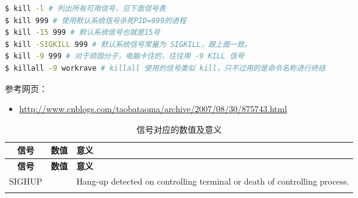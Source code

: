 \documentclass[doctor,openright,twoside]{sjtuthesis}
\providecommand{\tightlist}{%
    \setlength{\itemsep}{0pt}\setlength{\parskip}{0pt}}
\theoremstyle{plain}
\theoremstyle{definition}
\theoremstyle{remark}
\theoremstyle{ocrenumbox}
\theoremstyle{plain}
\begin{document}
\begin{lstlisting}[language=bash]
$ kill -l # 列出所有可用信号，见下面信号表
$ kill 999 # 使用默认系统信号杀死PID=999的进程
$ kill -15 999 # 默认系统信号也就是15号
$ kill -SIGKILL 999 # 默认系统信号常量为 SIGKILL，跟上面一致。
$ kill -9 999 # 对于顽固分子，电脑卡住的，往往用 -9 KILL 信号
$ killall -9 workrave # killall 使用的信号类似 kill，只不过用的是命令名称进行终结
\end{lstlisting}

参考网页：

\begin{itemize}
\tightlist
\item
  \url{http://www.cnblogs.com/taobataoma/archive/2007/08/30/875743.html}
\end{itemize}

\begin{longtable}[]{@{}ccl@{}}
\caption{信号对应的数值及意义}\tabularnewline
\toprule
\begin{minipage}[b]{0.10\columnwidth}\centering
\textbf{信号}\strut
\end{minipage} & \begin{minipage}[b]{0.12\columnwidth}\centering
\textbf{数值}\strut
\end{minipage} & \begin{minipage}[b]{0.70\columnwidth}\raggedright
\textbf{意义}\strut
\end{minipage}\tabularnewline
\midrule
\endfirsthead
\toprule
\begin{minipage}[b]{0.10\columnwidth}\centering
\textbf{信号}\strut
\end{minipage} & \begin{minipage}[b]{0.12\columnwidth}\centering
\textbf{数值}\strut
\end{minipage} & \begin{minipage}[b]{0.70\columnwidth}\raggedright
\textbf{意义}\strut
\end{minipage}\tabularnewline
\midrule
\endhead
\begin{minipage}[t]{0.10\columnwidth}\centering
SIGHUP\strut
\end{minipage} & \begin{minipage}[t]{0.12\columnwidth}\centering
1\strut
\end{minipage} & \begin{minipage}[t]{0.70\columnwidth}\raggedright
Hang-up detected on controlling terminal or death of controlling process.\strut
\end{minipage}\tabularnewline
\begin{minipage}[t]{0.10\columnwidth}\centering

\end{minipage}
\end{longtable}
\end{document}
